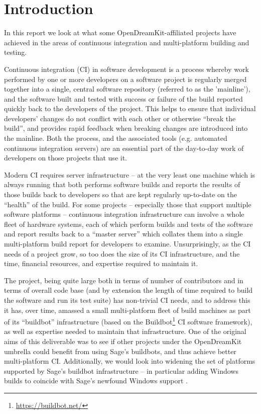 \documentclass{deliverablereport}
\author{E. M. Bray, Alexander Konovalov, Julian R\"uth}
\begin{document}
\maketitle

\hypertarget{introduction}{%
\section{Introduction}\label{introduction}}

In this report we look at what some OpenDreamKit-affiliated projects have
achieved in the areas of continuous integration and multi-platform building and
testing.

Continuous integration (CI) in software development is a process whereby work
performed by one or more developers on a software project is regularly merged
together into a single, central software repository (referred to as the
'mainline'), and the software built and tested with success or failure of the
build reported quickly back to the developers of the project.  This helps to
ensure that individual developers' changes do not conflict with each other or
otherwise ``break the build'', and provides rapid feedback when breaking changes
are introduced into the mainline.  Both the process, and the associated tools
(e.g. automated continuous integration servers) are an essential part of the
day-to-day work of developers on those projects that use it.

Modern CI requires server infrastructure -- at the very least one machine which
is always running that both performs software builds and reports the results of
those builds back to developers so that are kept regularly up-to-date on the
``health'' of the build.  For some projects --  especially those that support
multiple software platforms -- continuous integration infrastructure can involve
a whole fleet of hardware systems, each of which perform builds and tests of
the software and report results back to a ``master server'' which collates them
into a single multi-platform build report for developers to examine.
Unsurprisingly, as the CI needs of a project grow, so too does the size of its
CI infrastructure, and the time, financial resources, and expertise required to
maintain it.

The \Sage project, being quite large both in terms of number of contributors
and in terms of overall code base (and by extension the length of time required
to build the software and run its test suite) has non-trivial CI needs, and to
address this it has, over time, amassed a small multi-platform fleet of build
machines as part of its ``buildbot'' infrastructure (based on the
Buildbot\footnote{\url{https://buildbot.net/}} CI software framework), as well
as expertise needed to maintain that infrastructure.  One of the original aims
of this deliverable was to see if other projects under the OpenDreamKit umbrella
could benefit from using Sage's buildbots, and thus achieve better
multi-platform CI.  Additionally, we would look into widening the set of
platforms supported by Sage's buildbot infrastructure -- in particular adding
Windows builds to coincide with Sage's newfound Windows support
.
\end{document}
